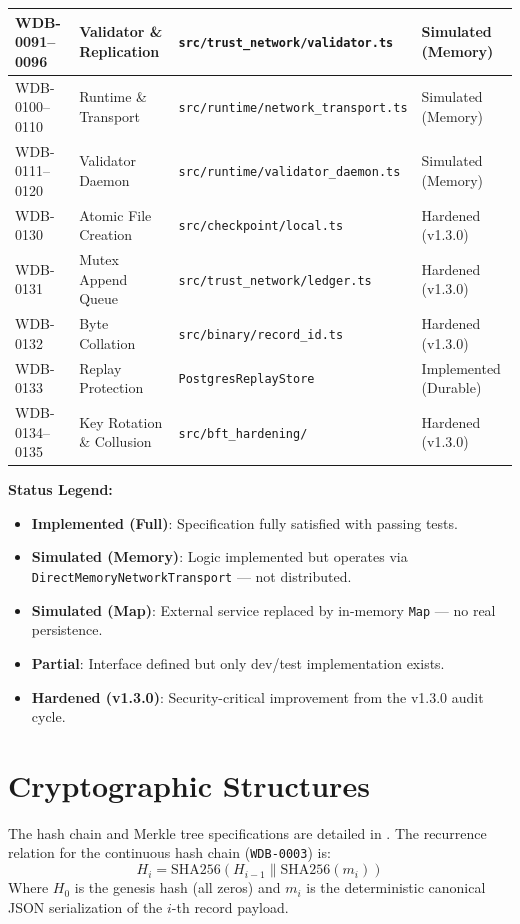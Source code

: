 \begin{longtable}{p{} p{} p{} p{}}
WDB-0091--0096 & Validator \& Replication & \texttt{src/trust\_network/validator.ts} & Simulated (Memory) \\
\midrule
WDB-0100--0110 & Runtime \& Transport & \texttt{src/runtime/network\_transport.ts} & Simulated (Memory) \\
WDB-0111--0120 & Validator Daemon & \texttt{src/runtime/validator\_daemon.ts} & Simulated (Memory) \\
\midrule
WDB-0130 & Atomic File Creation & \texttt{src/checkpoint/local.ts} & Hardened (v1.3.0) \\
WDB-0131 & Mutex Append Queue & \texttt{src/trust\_network/ledger.ts} & Hardened (v1.3.0) \\
WDB-0132 & Byte Collation & \texttt{src/binary/record\_id.ts} & Hardened (v1.3.0) \\
WDB-0133 & Replay Protection & \texttt{PostgresReplayStore} & Implemented (Durable) \\
WDB-0134--0135 & Key Rotation \& Collusion & \texttt{src/bft\_hardening/} & Hardened (v1.3.0) \\

\end{longtable}

\textbf{Status Legend:}
\begin{itemize}[nosep]
    \item \textbf{Implemented (Full)}: Specification fully satisfied with passing tests.
    \item \textbf{Simulated (Memory)}: Logic implemented but operates via \texttt{DirectMemoryNetworkTransport} --- not distributed.
    \item \textbf{Simulated (Map)}: External service replaced by in-memory \texttt{Map} --- no real persistence.
    \item \textbf{Partial}: Interface defined but only dev/test implementation exists.
    \item \textbf{Hardened (v1.3.0)}: Security-critical improvement from the v1.3.0 audit cycle.
\end{itemize}

\section{Cryptographic Structures}
\label{app-sec:wdb-crypto}

The hash chain and Merkle tree specifications are detailed in . The recurrence relation for the continuous hash chain (\texttt{WDB-0003}) is:
\begin{equation}
    H_i = \text{SHA256}\left( H_{i-1} \parallel \text{SHA256}(m_i) \right)
\end{equation}
Where $H_0$ is the genesis hash (all zeros) and $m_i$ is the deterministic canonical JSON serialization of the $i$-th record payload.

